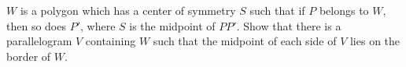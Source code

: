 $W$ is a polygon which has a center of symmetry $S$ such that if $P$ belongs to $W$, then so does $P'$, where $S$ is the midpoint of $PP'$. Show that there is a parallelogram $V$ containing $W$ such that the midpoint of each side of $V$ lies on the border of $W$.